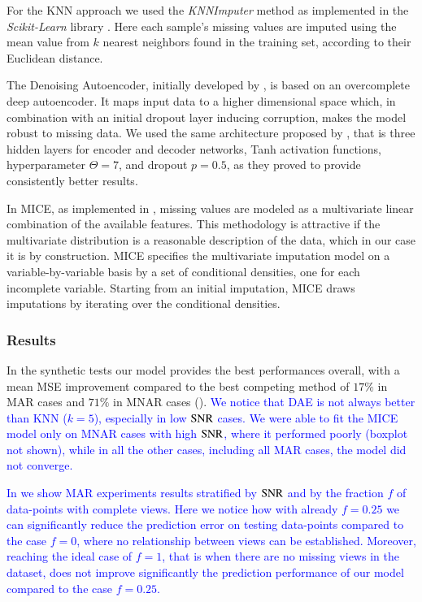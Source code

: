 For the KNN approach we used the \textit{KNNImputer} method as implemented in the \textit{Scikit-Learn} library \citep{sklearn}.
Here each sample's missing values are imputed using the mean value from $k$ nearest neighbors found in the training set, according to their Euclidean distance.

The Denoising Autoencoder, initially developed by \cite{Vincent2008}, is based on an overcomplete deep autoencoder.
It maps input data to a higher dimensional space which, in combination with an initial dropout layer inducing corruption, makes the model robust to missing data.
We used the same architecture proposed by \cite{dae}, that is three hidden layers for encoder and decoder networks, Tanh activation functions, hyperparameter $\Theta=7$, and dropout $p=0.5$, as they proved to provide consistently better results.

In MICE, as implemented in \cite{mice}, missing values are modeled as a multivariate linear combination of the available features.
This methodology is attractive if the multivariate distribution is a reasonable description of the data, which in our case it is by construction.
MICE specifies the multivariate imputation model on a variable-by-variable basis by a set of conditional densities, one for each incomplete variable.
Starting from an initial imputation, MICE draws imputations by iterating over the conditional densities.

\subsubsection{Results}


In the synthetic tests our model provides the best performances overall, with a mean MSE improvement compared to the best competing method of $17\%$ in MAR cases and $71\%$ in MNAR cases ().
\textcolor{blue}{
	We notice that DAE is not always better than KNN ($k=5$), especially in low $\operatorname{SNR}$ cases.
}
\textcolor{blue}{
	We were able to fit the MICE model only on MNAR cases with high $\operatorname{SNR}$, where it performed poorly (boxplot not shown), while in all the other cases, including all MAR cases, the model did not converge.
}

\textcolor{blue}{
	In  we show MAR experiments results stratified by $\operatorname{SNR}$ and by the fraction $f$ of data-points with complete views.
	Here we notice how with already $f = 0.25$ we can significantly reduce the prediction error on testing data-points compared to the case $f=0$, where no relationship between views can be established.
	Moreover, reaching the ideal case of $f=1$, that is when there are no missing views in the dataset, does not improve significantly the prediction performance of our model compared to the case $f = 0.25$.
}
